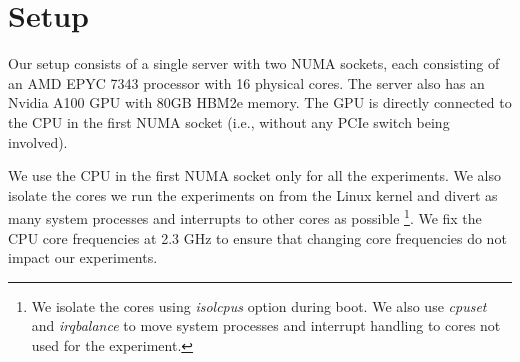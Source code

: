 \section{Setup}
\label{sec:interconnect-sc-setup}

Our setup consists of a single server with two NUMA sockets, each consisting of an AMD EPYC 7343 processor with 16 physical cores.
The server also has an Nvidia A100 GPU with 80GB HBM2e memory.
The GPU is directly connected to the CPU in the first NUMA socket (i.e., without any PCIe switch being involved).

We use the CPU in the first NUMA socket only for all the experiments.
We also isolate the cores we run the experiments on from the Linux kernel and divert as many system processes and interrupts to other cores as possible
\footnote{We isolate the cores using \textit{isolcpus} option during boot. We also use \textit{cpuset} and \textit{irqbalance} to move system processes and interrupt handling to cores not used for the experiment.}.
We fix the CPU core frequencies at 2.3 GHz to ensure that changing core frequencies do not impact our experiments.
